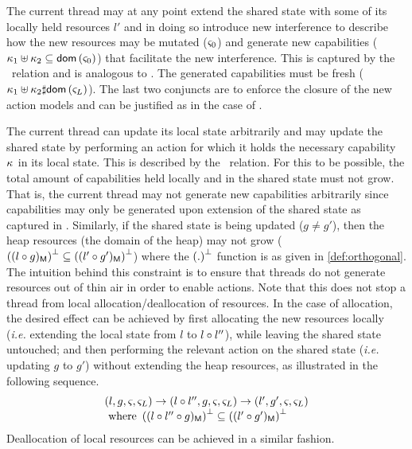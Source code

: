 %
%
The current thread may at any point extend the shared state with some of its locally held resources $l'$ and in doing so introduce new interference to describe how the new resources may be mutated ($\varsigma_{0}$) and generate  new capabilities ($\kappa_{1} \uplus \kappa_{2} \subseteq \textsf{dom}\left( \varsigma_{0} \right)$) that facilitate the new interference. This is captured by the \extendG\ relation and is analogous to \extendR.  The generated capabilities must be fresh ($\kappa_{1} \uplus \kappa_{2}  \sharp \textsf{dom}\left( \varsigma_{L} \right)$). The last two conjuncts are to enforce the closure of the new action models and can be justified as in the case of \extendR.

The current thread can update its local state arbitrarily and may update the shared state by performing an action for which it holds the necessary capability $\kappa_{}$ in its local state. This is described by the \updateG\ relation. For this to be possible, the total amount of capabilities held locally and in the shared state must not grow. That is, the current thread may not generate new capabilities arbitrarily since capabilities may only be generated upon extension of the shared state as captured in \extendG. Similarly, if the shared state is being updated ($g \not= g'$),  then the heap resources (the domain of the heap) may not grow ($\left((l \circ g)_{\textsf{M}}\right)^{\bot} \subseteq \left((l' \circ g')_{\textsf{M}}\right)^{\bot}$) where the $\left(.\right)^{\bot}$ function is as given in \ref{def:orthogonal}. The intuition behind this constraint is to ensure that threads do not generate resources out of thin air in order to enable actions. Note that this does not stop a thread from local allocation/deallocation of resources. In the case of allocation, the desired effect can be achieved by first allocating the new resources locally (\textit{i.e.} extending the local state from $l$ to $l \circ l''$), while leaving the shared state untouched; and then performing the relevant action on the shared state (\textit{i.e.} updating $g$ to $g'$) without extending the heap resources, as illustrated in the following sequence.
%
\[
\begin{array}{l}
	(l, g, \varsigma_{}, \varsigma_{L}) \rightarrow (l \circ l'', g, \varsigma_{}, \varsigma_{L}) \rightarrow (l', g', \varsigma_{}, \varsigma_{L})\\
	\text{ where } \left((l \circ l'' \circ g)_{\textsf{M}}\right)^{\bot} \subseteq \left((l' \circ g')_{\textsf{M}}\right)^{\bot}
\end{array}
\]
%
Deallocation of local resources can be achieved in a similar fashion.

